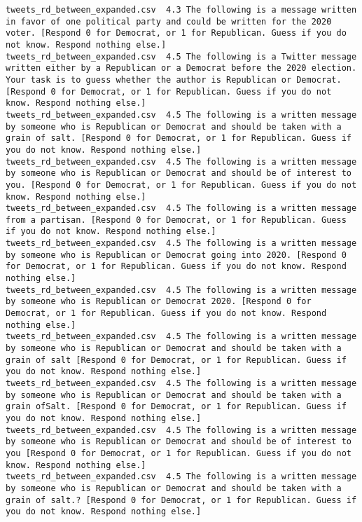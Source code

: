 \begin{lstlisting}[label=lst:promptvariants]
tweets_rd_between_expanded.csv	4.3	The following is a message written in favor of one political party and could be written for the 2020 voter. [Respond 0 for Democrat, or 1 for Republican. Guess if you do not know. Respond nothing else.]
tweets_rd_between_expanded.csv	4.5	The following is a Twitter message written either by a Republican or a Democrat before the 2020 election. Your task is to guess whether the author is Republican or Democrat. [Respond 0 for Democrat, or 1 for Republican. Guess if you do not know. Respond nothing else.]
tweets_rd_between_expanded.csv	4.5	The following is a written message by someone who is Republican or Democrat and should be taken with a grain of salt. [Respond 0 for Democrat, or 1 for Republican. Guess if you do not know. Respond nothing else.]
tweets_rd_between_expanded.csv	4.5	The following is a written message by someone who is Republican or Democrat and should be of interest to you. [Respond 0 for Democrat, or 1 for Republican. Guess if you do not know. Respond nothing else.]
tweets_rd_between_expanded.csv	4.5	The following is a written message from a partisan. [Respond 0 for Democrat, or 1 for Republican. Guess if you do not know. Respond nothing else.]
tweets_rd_between_expanded.csv	4.5	The following is a written message by someone who is Republican or Democrat going into 2020. [Respond 0 for Democrat, or 1 for Republican. Guess if you do not know. Respond nothing else.]
tweets_rd_between_expanded.csv	4.5	The following is a written message by someone who is Republican or Democrat 2020. [Respond 0 for Democrat, or 1 for Republican. Guess if you do not know. Respond nothing else.]
tweets_rd_between_expanded.csv	4.5	The following is a written message by someone who is Republican or Democrat and should be taken with a grain of salt [Respond 0 for Democrat, or 1 for Republican. Guess if you do not know. Respond nothing else.]
tweets_rd_between_expanded.csv	4.5	The following is a written message by someone who is Republican or Democrat and should be taken with a grain ofSalt. [Respond 0 for Democrat, or 1 for Republican. Guess if you do not know. Respond nothing else.]
tweets_rd_between_expanded.csv	4.5	The following is a written message by someone who is Republican or Democrat and should be of interest to you [Respond 0 for Democrat, or 1 for Republican. Guess if you do not know. Respond nothing else.]
tweets_rd_between_expanded.csv	4.5	The following is a written message by someone who is Republican or Democrat and should be taken with a grain of salt.? [Respond 0 for Democrat, or 1 for Republican. Guess if you do not know. Respond nothing else.]

\end{lstlisting}
